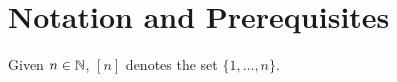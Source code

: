 \section{Notation and Prerequisites}
	
	Given $n \in \mathbb{N}$, $[n]$ denotes the set $\{1,\ldots,n\}$.

\clearpage
